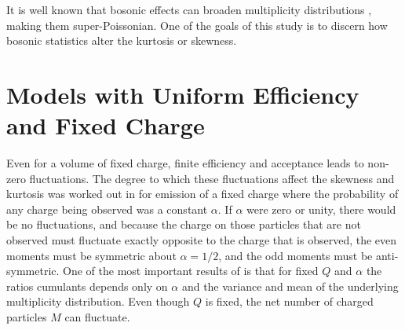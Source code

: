 \documentclass[aps,prc,nofootinbib,showpacs,superscriptaddress,groupedaddress]{revtex4-1}
\begin{document}
It is well known that bosonic effects can broaden multiplicity distributions \cite{negativebinomial}, making them super-Poissonian. One of the goals of this study is to discern how bosonic statistics alter the kurtosis or skewness. 

\section{Models with Uniform Efficiency and Fixed Charge}\label{sec:uniformeff}

Even for a volume of fixed charge, finite efficiency and acceptance leads to non-zero fluctuations. The degree to which these fluctuations affect the skewness and kurtosis was worked out in \cite{Savchuk:2019xfg} for emission of a fixed charge where the probability of any charge being observed was a constant $\alpha$. If $\alpha$ were zero or unity, there would be no fluctuations, and because the charge on those particles that are not observed must fluctuate exactly opposite to the charge that is observed, the even moments must be symmetric about $\alpha=1/2$, and the odd moments must be anti-symmetric. One of the most important results of \cite{Savchuk:2019xfg} is that for fixed $Q$ and $\alpha$ the ratios cumulants depends only on $\alpha$ and the variance and mean of the underlying multiplicity distribution. Even though $Q$ is fixed, the net number of charged particles $M$ can fluctuate. 
\end{document}
